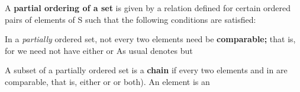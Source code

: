 \documentclass[11pt,oneside]{article}
\begin{document}
\begin{BookBody}
 A\textbf{ partial ordering of a set}  is given by a relation \BookInline{\leq } defined for certain ordered pairs of elements of S such that the following conditions are satisfied:



 \BookEnd{\blacksquare}

In a\textit{ partially} ordered set, not every two elements need be\textbf{ comparable;} that is, for  we need not have either  or  As usual denotes  but 

A subset  of a partially ordered set  is a\textbf{ chain} if every two elements  and  in  are comparable, that is, either  or or both). An element  is an

\end{BookBody}

\BookNarrativetrue
\end{document}
